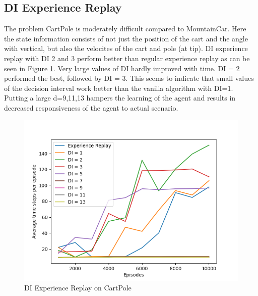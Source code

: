 \documentclass{article}
\begin{document}
\subsection{DI Experience Replay}
The problem CartPole is moderately difficult compared to MountainCar. Here the state information consists of not just the position of the cart and the angle with vertical, but also the velocites of the cart and pole (at tip). 
DI experience replay with DI 2 and 3 perform better than regular experience replay as can be seen in Figure \ref{fig:expReplay}. Very large values of DI hardly improved with time. DI = 2 performed the best, followed by DI = 3. This seems to indicate that small values of the decision interval work better than the vanilla algorithm with DI=1. Putting a large d=9,11,13 hampers the learning of the agent and results in decreased responsiveness of the agent to actual scenario.
\begin{figure}
  \centering
  \includegraphics[scale=0.75]{ExpReplay_cartPole.png}
  \caption{DI Experience Replay on CartPole}
  \label{fig:expReplay}
\end{figure}
\end{document}
